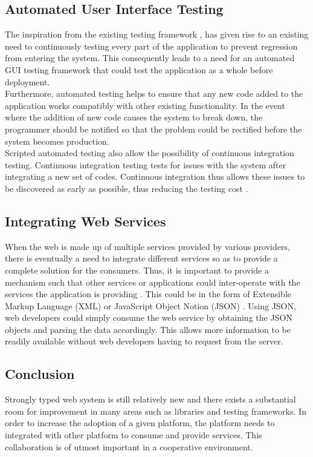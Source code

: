 \documentclass[12pt,fullpage]{article}
\begin{document}
\subsection{Automated User Interface Testing}
The inspiration from the existing testing framework \parencite{nagarani12}, has
given rise to an existing need to continuously testing every part of the application to
prevent regression \parencite{collins12} from entering the system. This
consequently leads to a need for an automated GUI testing framework that could
test the application as a whole before deployment.
\\
Furthermore, automated testing helps to ensure that any new code added to the
application works compatibly with other existing functionality. In the event
where the addition of new code causes the system to break down, the programmer
should be notified so that the problem could be rectified before the system
becomes production.
\\
Scripted automated testing also allow the possibility of continuous integration
testing. Continuous integration testing tests for issues with the system after
integrating a new set of codes. Continuous integration thus allows these issues
to be discovered as early as possible, thus reducing the testing cost
\parencite{liu09}.

\subsection{Integrating Web Services}
When the web is made up of multiple services provided by various providers,
there is eventually a need to integrate different services so as to provide a
complete solution for the consumers. Thus, it is important to provide a mechanism
such that other services or applications could inter-operate with the services the
application is providing \parencite{bosworth01}. This could be in the form of
Extensible Markup Language (XML) or JavaScript Object Notion (JSON)
\parencite{lin12}. Using JSON, web developers could simply consume the web
service by obtaining the JSON objects and parsing the data accordingly. This allows
more information to be readily available without web developers having to
request from the server.

\subsection{Conclusion}
Strongly typed web system is still relatively new and there exists a substantial
room for improvement in many areas such as libraries and testing frameworks. In
order to increase the adoption of a given platform, the platform needs to
integrated with other platform to consume and provide services. This
collaboration is of utmost important in a cooperative environment.
\end{document}
